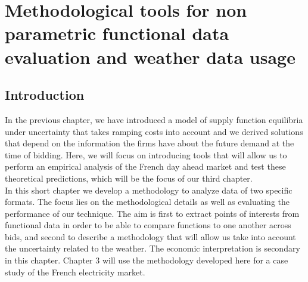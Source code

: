 

\renewcommand{\thesection}{\arabic{chapter}.\arabic{section}}


\chapter{Methodological tools for non parametric functional data evaluation and weather data usage} 
\label{chap:ch1-5}
\cleardoublepage

\doublespacing
\section{Introduction}
In the previous chapter, we have introduced a model of supply function equilibria under uncertainty that takes ramping costs into account and we derived solutions that depend on the information the firms have about the future demand at the time of bidding. Here, we will focus on introducing tools that will allow us to perform an empirical analysis of the French day ahead market and test these theoretical predictions, which will be the focus of our third chapter.\\

In this short chapter we develop a methodology to analyze data of two specific formats. The focus lies on the methodological details as well as evaluating the performance of our technique. The aim is first to extract points of interests from functional data in order to be able to compare functions to one another across bids, and second to describe a methodology that will allow us take into account the uncertainty related to the weather. The economic interpretation is secondary in this chapter. Chapter 3 will use the methodology developed here for a case study of the French electricity market.\\

